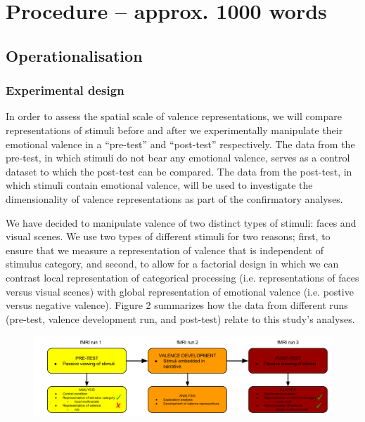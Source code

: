 \documentclass[12pt,a4paper]{article}\usepackage[]{graphicx}\usepackage[]{color}
\begin{document}
\noindent
\wordcount 

\section{Procedure \textmd{– approx. 1000 words}}
\subsection{Operationalisation}
\subsubsection{Experimental design}
In order to assess the spatial scale of valence representations, we will compare representations of stimuli before and after we experimentally manipulate their emotional valence in a ``pre-test'' and ``post-test'' respectively. The data from the pre-test, in which stimuli do not bear any emotional valence, serves as a control dataset to which the post-test can be compared. The data from the post-test, in which stimuli contain emotional valence, will be used to investigate the dimensionality of valence representations as part of the confirmatory analyses.      

We have decided to manipulate valence of two distinct types of stimuli: faces and visual scenes. We use two types of different stimuli for two reasons; first, to ensure that we measure a representation of valence that is independent of stimulus category, and second, to allow for a factorial design in which we can contrast local representation of categorical processing (i.e. representations of faces versus visual scenes) with global representation of emotional valence (i.e. postive versus negative valence). Figure 2 summarizes how the data from different runs (pre-test, valence development run, and post-test) relate to this study's analyses.

\begin{figure}[h]
\centering
\includegraphics[scale=.32]{runs_exp}
\end{figure}
\end{document}
